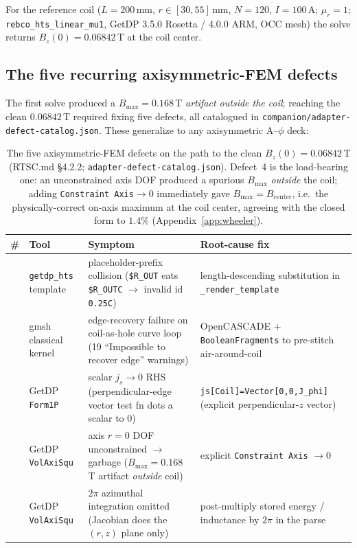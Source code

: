 For the reference coil ($L\!=\!200$\,mm, $r\!\in\![30,55]$\,mm, $N\!=\!120$,
$I\!=\!100$\,A; $\mu_r\!=\!1$; \texttt{rebco\_hts\_linear\_mu1}, GetDP
3.5.0 Rosetta / 4.0.0 ARM, OCC mesh) the solve returns
$B_z(0)\!=\!0.06842$\,T at the coil center.

\subsection{The five recurring axisymmetric-FEM defects}
\label{app:getdp-defects}

The first solve produced a $B_{\max}=0.168$\,T \emph{artifact outside the
coil}; reaching the clean $0.06842$\,T required fixing five defects, all
catalogued in \texttt{companion/adapter-defect-catalog.json}. These
generalize to any axisymmetric A--$\phi$ deck:

\begin{table}[h]
\centering
\small
\setlength{\tabcolsep}{4pt}
\begin{tabular}{@{}>{\centering\arraybackslash}m{0.3cm} >{\raggedright\arraybackslash}m{2.3cm} >{\raggedright\arraybackslash}m{5.0cm} >{\raggedright\arraybackslash}m{4.4cm}@{}}
\toprule
\textbf{\#} & \textbf{Tool} & \textbf{Symptom} & \textbf{Root-cause fix} \\
\midrule
1 & \texttt{getdp\_hts} template & placeholder-prefix collision
  (\texttt{\$R\_OUT} eats \texttt{\$R\_OUTC} $\to$ invalid id \texttt{0.25C})
  & length-descending substitution in \texttt{\_render\_template} \\
2 & gmsh classical kernel & edge-recovery failure on coil-as-hole curve
  loop (19 ``Impossible to recover edge'' warnings)
  & OpenCASCADE + \texttt{BooleanFragments} to pre-stitch air-around-coil \\
3 & GetDP \texttt{Form1P} & scalar $j_s\!\to\!0$ RHS (perpendicular-edge
  vector test fn dots a scalar to 0)
  & \texttt{js[Coil]=Vector[0,0,J\_phi]} (explicit perpendicular-$z$ vector) \\
4 & GetDP \texttt{VolAxiSqu} & axis $r\!=\!0$ DOF unconstrained $\to$
  garbage ($B_{\max}\!=\!0.168$\,T artifact \emph{outside} coil)
  & explicit \texttt{Constraint Axis} $\to 0$ \\
5 & GetDP \texttt{VolAxiSqu} & $2\pi$ azimuthal integration omitted
  (Jacobian does the $(r,z)$ plane only)
  & post-multiply stored energy / inductance by $2\pi$ in the parse \\
\bottomrule
\end{tabular}
\caption{The five axisymmetric-FEM defects on the path to the clean
$B_z(0)=0.06842$\,T (RTSC.md \S4.2.2; \texttt{adapter-defect-catalog.json}).
Defect~4 is the load-bearing one: an unconstrained axis DOF produced a
spurious $B_{\max}$ \emph{outside} the coil; adding
\texttt{Constraint Axis}$\to\!0$ immediately gave $B_{\max}=B_{\text{center}}$,
i.e.\ the physically-correct on-axis maximum at the coil center, agreeing
with the closed form to $1.4$\% (Appendix~\ref{app:wheeler}).}
\label{tab:getdp-defects}
\end{table}

